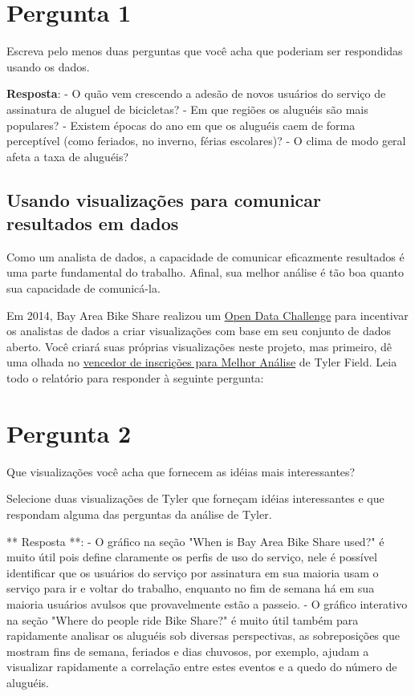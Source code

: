 \documentclass[11pt]{article}
\begin{document}
    \section{Pergunta 1}\label{pergunta-1}

Escreva pelo menos duas perguntas que você acha que poderiam ser
respondidas usando os dados.

    \textbf{Resposta}: - O quão vem crescendo a adesão de novos usuários do
serviço de assinatura de aluguel de bicicletas? - Em que regiões os
aluguéis são mais populares? - Existem épocas do ano em que os aluguéis
caem de forma perceptível (como feriados, no inverno, férias escolares)?
- O clima de modo geral afeta a taxa de aluguéis?

    \subsection{Usando visualizações para comunicar resultados em
dados}\label{usando-visualizauxe7uxf5es-para-comunicar-resultados-em-dados}

Como um analista de dados, a capacidade de comunicar eficazmente
resultados é uma parte fundamental do trabalho. Afinal, sua melhor
análise é tão boa quanto sua capacidade de comunicá-la.

Em 2014, Bay Area Bike Share realizou um
\href{http://www.bayareabikeshare.com/datachallenge-2014}{Open Data
Challenge} para incentivar os analistas de dados a criar visualizações
com base em seu conjunto de dados aberto. Você criará suas próprias
visualizações neste projeto, mas primeiro, dê uma olhada no
\href{http://thfield.github.io/babs/index.html}{vencedor de inscrições
para Melhor Análise} de Tyler Field. Leia todo o relatório para
responder à seguinte pergunta:

    \section{Pergunta 2}\label{pergunta-2}

Que visualizações você acha que fornecem as idéias mais interessantes?

Selecione duas visualizações de Tyler que forneçam idéias interessantes
e que respondam alguma das perguntas da análise de Tyler.

    ** Resposta **: - O gráfico na seção "When is Bay Area Bike Share used?"
é muito útil pois define claramente os perfis de uso do serviço, nele é
possível identificar que os usuários do serviço por assinatura em sua
maioria usam o serviço para ir e voltar do trabalho, enquanto no fim de
semana há em sua maioria usuários avulsos que provavelmente estão a
passeio. - O gráfico interativo na seção "Where do people ride Bike
Share?" é muito útil também para rapidamente analisar os aluguéis sob
diversas perspectivas, as sobreposições que mostram fins de semana,
feriados e dias chuvosos, por exemplo, ajudam a visualizar rapidamente a
correlação entre estes eventos e a quedo do número de aluguéis.
\end{document}
